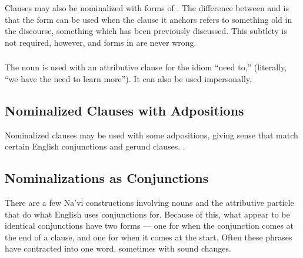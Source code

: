 \subsubsection{} Clauses may also be nominalized with forms of
.  The difference between  and  is that the
 form can be used when the clause it anchors refers to
something old in the discourse, something which has been previously
discussed.  This subtlety is not required, however, and forms in
 are never wrong. 

\subsubsection{} The noun   is used with an
attributive clause for the idiom ``need to,''   (literally, ``we have the need
to learn more''). 
It can also be used impersonally,  


\subsection{Nominalized Clauses with Adpositions} Nominalized clauses
may be used with some adpositions, giving sense that match certain
English conjunctions and gerund clauses.   .\label{syn:rel:nom-adp}


\subsubsection{}  



\subsection{Nominalizations as Conjunctions} There are a few Na'vi
constructions involving nouns and the attributive particle that do
what English uses conjunctions for.  Because of this, what appear to
be identical conjunctions have two forms --- one for when the
conjunction comes at the end of a clause, and one for when it comes at
the start.  Often these phrases have contracted into one word,
sometimes with sound changes.

